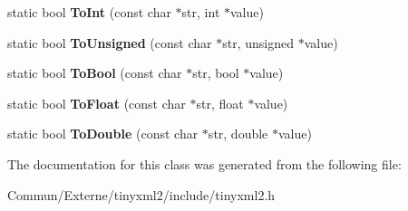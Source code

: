 \begin{DoxyCompactItemize}
\item 
static bool {\bfseries To\+Int} (const char $\ast$str, int $\ast$value)\hypertarget{classtinyxml2_1_1_x_m_l_util_ac7fa220dd1c428ed6a77850d56a6e4bf}{}\label{classtinyxml2_1_1_x_m_l_util_ac7fa220dd1c428ed6a77850d56a6e4bf}

\item 
static bool {\bfseries To\+Unsigned} (const char $\ast$str, unsigned $\ast$value)\hypertarget{classtinyxml2_1_1_x_m_l_util_a46f7e9542929001e726853ed8b571c07}{}\label{classtinyxml2_1_1_x_m_l_util_a46f7e9542929001e726853ed8b571c07}

\item 
static bool {\bfseries To\+Bool} (const char $\ast$str, bool $\ast$value)\hypertarget{classtinyxml2_1_1_x_m_l_util_ae1692c644a807da2cd9e1e45f79a102f}{}\label{classtinyxml2_1_1_x_m_l_util_ae1692c644a807da2cd9e1e45f79a102f}

\item 
static bool {\bfseries To\+Float} (const char $\ast$str, float $\ast$value)\hypertarget{classtinyxml2_1_1_x_m_l_util_ac13b56b82e7f1d2d3954666b76c67d22}{}\label{classtinyxml2_1_1_x_m_l_util_ac13b56b82e7f1d2d3954666b76c67d22}

\item 
static bool {\bfseries To\+Double} (const char $\ast$str, double $\ast$value)\hypertarget{classtinyxml2_1_1_x_m_l_util_a7e37ab30ba19c2b02042ab093172e9b8}{}\label{classtinyxml2_1_1_x_m_l_util_a7e37ab30ba19c2b02042ab093172e9b8}

\end{DoxyCompactItemize}


The documentation for this class was generated from the following file\+:\begin{DoxyCompactItemize}
\item 
Commun/\+Externe/tinyxml2/include/tinyxml2.\+h\end{DoxyCompactItemize}
